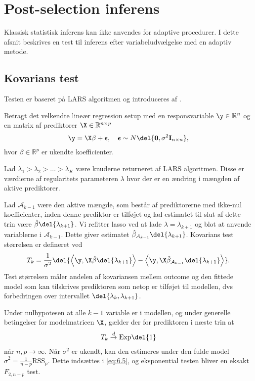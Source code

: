 \section{Post-selection inferens}
Klassisk statistisk inferens kan ikke anvendes for adaptive procedurer.
I dette afsnit beskrives en test til inferens efter variabeludvælgelse med en adaptiv metode.


\subsection{Kovarians test}
Testen er baseret på LARS algoritmen og introduceres af \citep{lockhart}.


Betragt det velkendte lineær regression setup med en responsvariable \(\y \in \mathbb{R}^n\) og en matrix af prediktorer \(\X \in \mathbb{R}^{n \times p}\)
\begin{align*}
\y = \X \beta + \boldsymbol{\epsilon}, \quad \boldsymbol{\epsilon} \sim N\del{\mathbf{0}, \sigma^2 \mathbf{I}_{n \times n}},
\end{align*}
hvor \(\beta \in \mathbb{R}^p\) er ukendte koefficienter.

Lad $\lambda_1 > \lambda_2 > \ldots > \lambda_K$ være knuderne returneret af LARS algoritmen.
Disse er værdierne af regularitets parameteren $\lambda$ hvor der er en ændring i mængden af aktive prediktorer.

Lad \(\mathcal{A}_{k-1}\) være den aktive mængde, som består af prediktorerne med ikke-nul koefficienter, inden denne prediktor er tilføjet og lad estimatet til slut af dette trin være \(\hat{\beta} \del{\lambda_{k+1}}\).
Vi refitter lasso ved at lade \(\lambda=\lambda_{k+1}\) og blot at anvende variablerne i \(\mathcal{A}_{k-1}\).
Dette giver estimatet \( \hat{\beta}_{\mathcal{A}_{k-1}} \del{\lambda_{k+1}}\).
Kovarians test størrelsen er defineret ved
\begin{align}
T_k = \frac{1}{\sigma^2} \del{ \left\langle \y, \X \hat{\beta} \del{\lambda_{k+1}} \right\rangle - \left\langle  \y, \X \hat{\beta}_{\mathcal{A}_{k-1}} \del{\lambda_{k+1}} \right\rangle}. \label{eq:6.5}
\end{align}
Test størrelsen måler andelen af kovariansen mellem outcome og den fittede model som kan tilskrives prediktoren som netop er tilføjet til modellen, dvs forbedringen over intervallet \(\del{\lambda_k, \lambda_{k+1}}\).

Under nulhypotesen at alle $k-1$ variable er i modellen, og under generelle betingelser for modelmatricen $\X$, gælder der for prediktoren i næste trin at
\begin{align*}
T_k \overset{d}{\rightarrow} \text{Exp}\del{1}
\end{align*}
når \(n, p \rightarrow \infty\).
Når \(\sigma^2\) er ukendt, kan den estimeres under den fulde model \(\hat{\sigma}^2 = \frac{1}{n-p} \text{RSS}_p\). 
Dette indsættes i \eqref{eq:6.5}, og eksponential testen bliver en eksakt \(F_{2,n-p}\) test.

